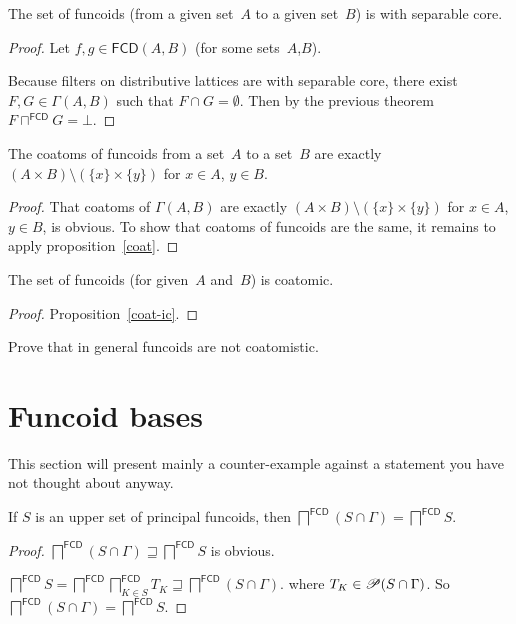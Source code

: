 \begin{thm}
The set of funcoids (from a given set~$A$ to a given set~$B$)
is with separable core.\end{thm}
\begin{proof}
Let $f,g\in\mathsf{FCD}(A,B)$ (for some sets~$A$,$B$).

Because filters on distributive lattices are with separable core,
there exist $F,G\in\Gamma(A,B)$ such that $F\cap G=\emptyset$. Then
by the previous theorem $F\sqcap^{\mathsf{FCD}}G=\bot$.\end{proof}
\begin{thm}
The coatoms of funcoids from a set~$A$ to a set~$B$ are exactly
$(A\times B)\setminus(\{x\}\times\{y\})$ for $x\in A$, $y\in B$.\end{thm}
\begin{proof}
That coatoms of $\Gamma(A,B)$
are exactly $(A\times B)\setminus(\{x\}\times\{y\})$ for $x\in A$,
$y\in B$, is obvious. To show that coatoms of funcoids are the same,
it remains to apply proposition~\ref{coat}.\end{proof}
\begin{thm}
The set of funcoids (for given~$A$ and~$B$) is coatomic.\end{thm}
\begin{proof}
Proposition~\ref{coat-ic}.\end{proof}
\begin{xca}
Prove that in general funcoids are not coatomistic.\end{xca}

\section{Funcoid bases}

This section will present mainly a counter-example against a statement you have not thought about anyway.

\begin{lem}
If $S$ is an upper set of principal funcoids, then
$\bigsqcap^{\mathsf{FCD}} (S\cap\Gamma)=\bigsqcap^{\mathsf{FCD}} S$.
\end{lem}

\begin{proof}
  $\bigsqcap^{\mathsf{FCD}} (S\cap\Gamma) \sqsupseteq \bigsqcap^{\mathsf{FCD}} S$ is obvious.
  
  $\bigsqcap^{\mathsf{FCD}} S = \bigsqcap^{\mathsf{FCD}} \bigsqcap^{\mathsf{FCD}}_{K\in S} T_K \sqsupseteq \bigsqcap^{\mathsf{FCD}} (S\cap\Gamma)$.
  where $T_K\in\mathscr{P} (S\cap\Gamma)$.
  So $\bigsqcap^{\mathsf{FCD}} (S\cap\Gamma) = \bigsqcap^{\mathsf{FCD}} S$.
\end{proof}

